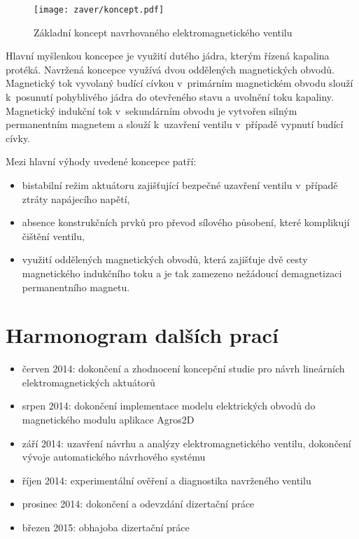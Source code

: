 \begin{figure}[h!]
  \centering
  \texttt{[image: zaver/koncept.pdf]}
  \caption{Základní koncept navrhovaného elektromagnetického ventilu}
  \label{obr:ventil}
\end{figure}

Hlavní myšlenkou koncepce je využití dutého jádra, kterým řízená kapalina protéká. Navržená koncepce využívá dvou oddělených magnetických obvodů. Magnetický tok vyvolaný budící cívkou v~primárním magnetickém obvodu slouží k~posunutí pohyblivého jádra do otevřeného stavu a uvolnění toku kapaliny. Magnetický indukční tok v~sekundárním obvodu je vytvořen silným permanentním magnetem a slouží k~uzavření ventilu v~případě vypnutí budící cívky.

Mezi hlavní výhody uvedené koncepce patří:
\begin{itemize}
    \item bistabilní režim aktuátoru zajišťující bezpečné uzavření ventilu v~případě ztráty napájecího napětí,
    \item absence konstrukčních prvků pro převod sílového působení, které komplikují čištění ventilu,
    \item využití oddělených magnetických obvodů, která zajišťuje dvě cesty magnetického indukčního toku a je tak zamezeno nežádoucí demagnetizaci permanentního magnetu.
\end{itemize}

\section{Harmonogram dalších prací}
\begin{itemize}
    \item červen 2014: dokončení a zhodnocení koncepční studie pro návrh lineárních elektromagnetických aktuátorů
    \item srpen 2014: dokončení implementace modelu elektrických obvodů do magnetického modulu aplikace Agros2D
    \item září 2014: uzavření návrhu a analýzy elektromagnetického ventilu, dokončení vývoje automatického návrhového systému
    \item říjen 2014: experimentální ověření a diagnostika navrženého ventilu
    \item prosinec 2014: dokončení a odevzdání dizertační práce
    \item březen 2015: obhajoba dizertační práce
\end{itemize}